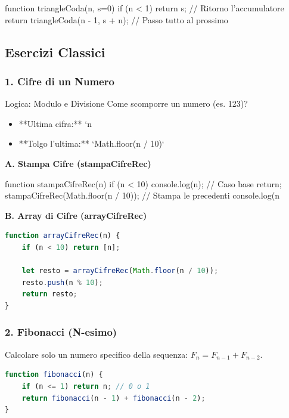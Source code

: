 \begin{jsbox}
function triangleCoda(n, s=0) {
    if (n < 1) return s;           // Ritorno l'accumulatore
    return triangleCoda(n - 1, s + n); // Passo tutto al prossimo
}
\end{jsbox}

\subsection{Esercizi Classici}

\subsubsection{1. Cifre di un Numero}
\begin{concept}{Logica: Modulo e Divisione}
Come scomporre un numero (es. 123)?
\begin{itemize}
    \item **Ultima cifra:** `n %
    \item **Tolgo l'ultima:** `Math.floor(n / 10)`
\end{itemize}
\end{concept}

\textbf{A. Stampa Cifre (stampaCifreRec)}
\begin{jsbox}
function stampaCifreRec(n) {
    if (n < 10) {
        console.log(n); // Caso base
        return;
    }
    stampaCifreRec(Math.floor(n / 10)); // Stampa le precedenti
    console.log(n %
}
\end{jsbox}

\textbf{B. Array di Cifre (arrayCifreRec)}
\begin{lstlisting}[language=JavaScript]
function arrayCifreRec(n) {
    if (n < 10) return [n];
    
    let resto = arrayCifreRec(Math.floor(n / 10));
    resto.push(n % 10);
    return resto;
}
\end{lstlisting}

\subsubsection{2. Fibonacci (N-esimo)}
Calcolare solo un numero specifico della sequenza: $F_n = F_{n-1} + F_{n-2}$.
\begin{lstlisting}[language=JavaScript]
function fibonacci(n) {
    if (n <= 1) return n; // 0 o 1
    return fibonacci(n - 1) + fibonacci(n - 2);
}
\end{lstlisting}

